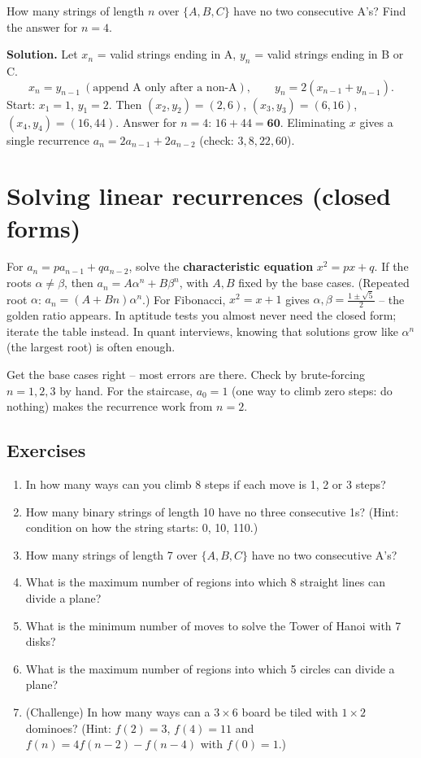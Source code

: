 \documentclass[11pt,a4paper,openany]{report}
\newenvironment{exercises}{\subsection*{Exercises \thechapter}\begin{enumerate}[label=\textbf{\thechapter.\arabic*},leftmargin=3.2em]}{\end{enumerate}}
\begin{document}
\begin{example}
How many strings of length $n$ over $\{A,B,C\}$ have no two consecutive A's? Find the answer for $n=4$.

\textbf{Solution.} Let $x_n$ = valid strings ending in A, $y_n$ = valid strings ending in B or C.
\[x_n=y_{n-1}\ (\text{append A only after a non-A}),\qquad y_n=2(x_{n-1}+y_{n-1}).\]
Start: $x_1=1$, $y_1=2$. Then $(x_2,y_2)=(2,6)$, $(x_3,y_3)=(6,16)$, $(x_4,y_4)=(16,44)$. Answer for $n=4$: $16+44=\mathbf{60}$.
Eliminating $x$ gives a single recurrence $a_n=2a_{n-1}+2a_{n-2}$ (check: $3, 8, 22, 60$).
\end{example}

\section{Solving linear recurrences (closed forms)}
For $a_n=pa_{n-1}+qa_{n-2}$, solve the \textbf{characteristic equation} $x^2=px+q$. If the roots $\alpha\neq\beta$, then
$a_n=A\alpha^n+B\beta^n$, with $A,B$ fixed by the base cases. (Repeated root $\alpha$: $a_n=(A+Bn)\alpha^n$.)
For Fibonacci, $x^2=x+1$ gives $\alpha,\beta=\frac{1\pm\sqrt5}2$ -- the golden ratio appears.
In aptitude tests you almost never need the closed form; iterate the table instead. In quant interviews,
knowing that solutions grow like $\alpha^n$ (the largest root) is often enough.

\begin{trap}
Get the base cases right -- most errors are there. Check by brute-forcing $n=1,2,3$ by hand. For the staircase,
$a_0=1$ (one way to climb zero steps: do nothing) makes the recurrence work from $n=2$.
\end{trap}

\begin{exercises}
\item In how many ways can you climb 8 steps if each move is 1, 2 or 3 steps?
\item How many binary strings of length 10 have no three consecutive 1s? (Hint: condition on how the string starts: 0, 10, 110.)
\item How many strings of length 7 over $\{A,B,C\}$ have no two consecutive A's?
\item What is the maximum number of regions into which 8 straight lines can divide a plane?
\item What is the minimum number of moves to solve the Tower of Hanoi with 7 disks?
\item What is the maximum number of regions into which 5 circles can divide a plane?
\item (Challenge) In how many ways can a $3\times6$ board be tiled with $1\times2$ dominoes? (Hint: $f(2)=3$, $f(4)=11$ and $f(n)=4f(n-2)-f(n-4)$ with $f(0)=1$.)
\end{exercises}
\end{document}
